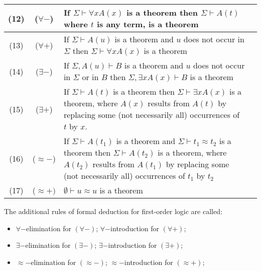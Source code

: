 \documentclass{article}
\begin{document}
\begin{table}[h]
    \centering
    \begin{tabular}{ccp{6cm}p{4cm}}\hline
        (12) & ($\forall -$) & {If $\Sigma \vdash \forall x A(x)$ is a theorem \newline then $\Sigma \vdash A(t)$ where $t$ is any term, is a theorem}\\ \hline
        (13) & ($\forall +$) & {If $\Sigma \vdash A(u)$ is a theorem and $u$ does not occur in $\Sigma$ \newline then $\Sigma \vdash \forall x A(x)$ is a theorem}\\ \hline
        (14) & ($\exists -$) & {If $\Sigma, A(u) \vdash B$ is a theorem
        \newline and $u$ does not occur in $\Sigma$ or in $B$ \newline
        then $\Sigma, \exists x A(x) \vdash B$ is a theorem}\\ \hline
        (15) & ($\exists +$) & {If $\Sigma \vdash A(t)$ is a theorem \newline 
        then $\Sigma \vdash \exists x A(x)$ is a theorem, \newline 
        where $A(x)$ results from $A(t)$ by replacing some (not necessarily all) occurrences of $t$ by $x$}. \\ \hline
        (16) & ($\approx -$) & {If $\Sigma \vdash A(t_1)$ is a theorem \newline
        and $\Sigma \vdash t_1 \approx t_2$ is a theorem \newline
        then $\Sigma \vdash A(t_2)$ is a theorem, where $A(t_2)$ results from $A(t_1)$ by replacing some (not necessarily all) occurrences of $t_1$ by $t_2$} \\ \hline
        (17) & ($\approx +)$ & $\emptyset \vdash u \approx u$ is a theorem\\ \hline
    \end{tabular}
\end{table}

The additional rules of formal deduction for first-order logic are called:
\begin{itemize}
    \item $\forall-$elimination for $(\forall -)$; $\forall-$introduction for $(\forall +)$;
    \item $\exists-$elimination for $(\exists -)$; $\exists-$introduction for $(\exists +)$;
    \item $\approx-$elimination for $(\approx -)$; $\approx-$introduction for $(\approx +)$;
\end{itemize}
\end{document}

